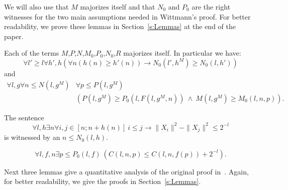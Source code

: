 
We will also use that $M$ majorizes itself and that $N_0$ and $P_0$ are the right witnesses for the two main assumptions needed in Wittmann's proof. For better readability, we prove these lemmas in Section~\ref{s:Lemmas} at the end of the paper.

\begin{lemma}[$M$ is a majorant]\label{l:M}
Each of the terms $M$,$P$,$N$,$M_0$,$P_0$,$N_0$,$R$ majorizes itself.
In particular we have:
\[ \forall l'\geq l\forall h',h ( \forall n (h(n)\geq h'(n)) \rightarrow N_0(l',h^M)\geq N_0(l,h') ) \]
and
\begin{align*}
 \forall l,g \forall n\leq N(l,g^M) &\forall p\leq P(l,g^M)\\
  &( P(l,g^M)\geq P_0(l,F(l,g^M,n))\ \wedge\ M(l,g^M)\geq M_0(l,n,p) ) . 
\end{align*}
\end{lemma}

\begin{lemma}[$N_0$ is correct]\label{l:N0}
The sentence
\[
\forall l,h \exists n \forall i,j\in[n;n+h(n)]\ i\leq j\rightarrow \|X_i\|^2-\|X_j\|^2\leq 2^{-l}
\]
is witnessed by an $n\leq N_0(l,h)$.
\end{lemma}

\begin{lemma}[$P_0$ is correct]\label{l:P0}
\[
\forall l,f,n\exists p\leq P_0(l,f)\ ( C(l,n,p)\leq C(l,n,f(p)) + 2^{-l} ).
\]
\end{lemma}

Next three lemmas give a quantitative analysis of the original proof in~\cite{Wittmann90}. Again, for better readability, we 
give the proofs in Section~\ref{s:Lemmas}. 

